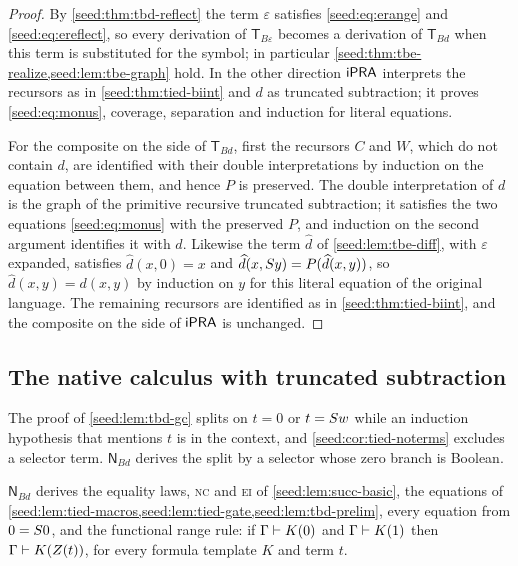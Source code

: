 \begin{proof}
By \cref{seed:thm:tbd-reflect} the term $\varepsilon$ satisfies
\eqref{seed:eq:erange} and \eqref{seed:eq:ereflect}, so every derivation of
$\mathsf{T}_{B\varepsilon}$ becomes a derivation of $\mathsf{T}_{Bd}$ when
this term is substituted for the symbol; in particular
\cref{seed:thm:tbe-realize,seed:lem:tbe-graph} hold. In the other direction
$\mathsf{iPRA}$ interprets the recursors as in \cref{seed:thm:tied-biint} and $d$ as
truncated subtraction; it proves \eqref{seed:eq:monus}, coverage, separation
and induction for literal equations.

For the composite on the side of $\mathsf{T}_{Bd}$, first the recursors
$C$ and $W$, which do not contain $d$, are identified with their double
interpretations by induction on the equation between them, and hence $P$ is
preserved. The double interpretation of $d$ is the graph of the primitive
recursive truncated subtraction; it satisfies the two equations
\eqref{seed:eq:monus} with the preserved $P$, and induction on the second
argument identifies it with $d$. Likewise the term $\widehat d$ of
\cref{seed:lem:tbe-diff}, with $\varepsilon$ expanded, satisfies
$\widehat d(x,0)=x$ and $\widehat d(x,S y)=P(\widehat d(x,y))$, so
$\widehat d(x,y)=d(x,y)$ by induction on $y$ for this literal equation of
the original language. The remaining recursors are identified as in
\cref{seed:thm:tied-biint}, and the composite on the side of $\mathsf{iPRA}$ is
unchanged.
\end{proof}

\subsection{The native calculus with truncated subtraction}

The proof of \cref{seed:lem:tbd-gc} splits on $t=0$ or $t=S w$ while an
induction hypothesis that mentions $t$ is in the context, and
\cref{seed:cor:tied-noterms} excludes a selector term. $\mathsf{N}_{Bd}$
derives the split by a selector whose zero branch is Boolean.

\begin{lemma}\label{seed:lem:nbd-basic}
$\mathsf{N}_{Bd}$ derives the equality laws, \textsc{nc} and \textsc{ei} of
\cref{seed:lem:succ-basic}, the equations of
\cref{seed:lem:tied-macros,seed:lem:tied-gate,seed:lem:tbd-prelim}, every
equation from $0=S 0$, and the functional range rule: if
$\Gamma\vdash K(0)$ and $\Gamma\vdash K(1)$ then
$\Gamma\vdash K(Z(t))$, for every formula template $K$ and term $t$.
\end{lemma}

